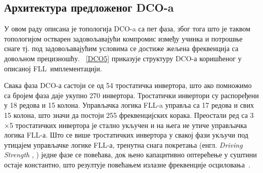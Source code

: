 \documentclass[master]{finthesis}
\makeatletter
\newcommand*{\engl}[2][\@empty]{%
    \edef\theacronym{#1}%
    (енгл. \foreignlanguage{english}{\emph{#2}%
    \ifx\theacronym\@empty \else , #1\fi})%
}
\def \FLL  {FLL} %
\def \DCO  {DCO} %
\makeatother
\begin{document}
\subsection{Архитектура предложеног \DCO-a}
У овом раду описана је топологија \DCO-a са пет фаза, због тога што је таквом топологијом остварен задовољавајући компромис између учинка и потрошње снаге тј. под задовољавајућим условима се достиже жељена фреквенција са довољном прецизношћу. \figurename~\ref{DCO5} приказује структуру \DCO-а коришћеног у описаној \FLL\ имплементацији. \par

Свака фаза \DCO-а састоји се од 54 тростатичка инвертора, што ако помножимо са бројем фаза даје укупно 270 инвертора. Тростатички инвертори су распоређени у 18 редова и 15 колона. Управљачка логика \FLL-a управља са 17 редова и свих 15 колона, што значи да постоји 255 фреквенцијских корака. Преостали ред са 3$\times$5 тростатичких инвертора је стално укључен и на њега не утиче управљачка логика \FLL-а. Што се више тростатичких инвертора у свакој фази укључи под утицајем управљачке логике \FLL-а, тренутна снага покретања \engl{Driving Strength} једне фазе се повећава, док њено капацитивно оптерећење у суштини остаје константно, што резултује повећањем излазне фреквенције осциловања~\cite{Tierno:4443210}.
\end{document}
